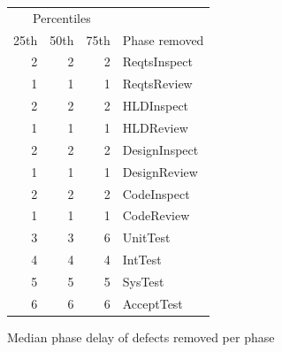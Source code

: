 \documentclass{sig-alternate}
\begin{document}
\begin{figure}[!ht]
\centering
\begin{tabular}{rrr|l}
    \multicolumn{3}{c|}{Percentiles}\\ 
  25th & 50th & 75th & Phase removed \\ 
  \hline
    2 & 2 & 2 & ReqtsInspect \\ 
    1 & 1 & 1 & ReqtsReview \\ 
    2 & 2 & 2 & HLDInspect \\ 
    1 & 1 & 1 & HLDReview \\ 
    2 & 2 & 2 & DesignInspect \\ 
    1 & 1 & 1 & DesignReview \\ 
    2 & 2 & 2 & CodeInspect \\ 
    1 & 1 & 1 & CodeReview \\ 
    3 & 3 & 6 & UnitTest \\ 
    4 & 4 & 4 & IntTest \\ 
    5 & 5 & 5 & SysTest \\ 
    6 & 6 & 6 & AcceptTest \\ 
  \end{tabular}
\caption{Median phase delay of defects removed per phase} 
\label{fig:phase_delay_medians}
\end{figure}

\end{document}
